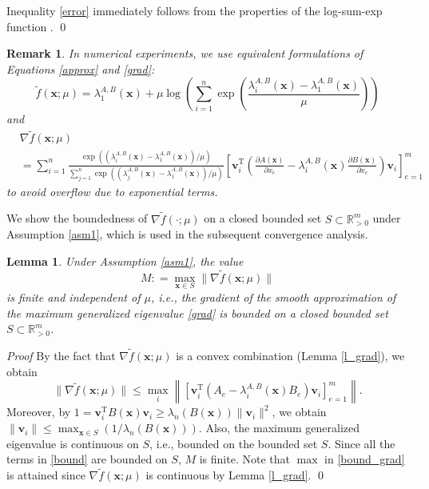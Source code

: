 \documentclass[sn-mathphys,Numbered]{sn-jnl}%
\theoremstyle{thmstyleone}%
\theoremstyle{thmstyletwo}%
\newtheorem{remark}{Remark}%
\theoremstyle{thmstylethree}%
\newtheorem{lemma}[theorem]{Lemma}
\newcommand{\e}[1]{\begin{equation}#1\end{equation}}
\newcommand{\s}[1]{\begin{split}#1\end{split}}
\newcommand{\prn}[1]{\left(#1\right)}
\newcommand{\nrm}[1]{\left\|#1\right\|}
\def\coloneq{\mathrel{\mathop:}=}
\def\rm{\mathbb{R}^m}
\def\tp{\mathrm{T}}
\def\lamx{\lambda^{A,B}_1(\boldsymbol{x})}
\def\lamxi{\lambda^{A,B}_i(\boldsymbol{x})}
\def\lamxj{\lambda^{A,B}_j(\boldsymbol{x})}
\begin{document}
Inequality \eqref{error} immediately follows from the properties of the log-sum-exp function \cite{beck17}.
\qed

\begin{remark}
In numerical experiments, we use equivalent formulations of Equations \eqref{approx} and \eqref{grad}:
\e{
\tilde{f}(\bm{x};\mu)=\lamx+\mu\log\left(\sum_{i=1}^n \exp{\left(\frac{\lamxi-\lamx}{\mu}\right)}\right)
}
and 
\e{\s{
& \nabla\tilde{f}(\bm{x};\mu)\\
& = \sum_{i=1}^n\frac{\exp\prn{\prn{\lamxi-\lamx}/\mu}}{\sum_{j=1}^n \exp\prn{\prn{\lamxj-\lamx}/\mu}}\left[\bm{v}_i^\tp \left(\frac{\partial A(\bm{x})}{\partial x_e}-\lamxi \frac{\partial B(\bm{x})}{\partial x_e}\right)\bm{v}_i\right]_{e=1}^m
}}
to avoid overflow due to exponential terms.
\end{remark}

We show the boundedness of $\nabla\tilde{f}(\cdot;\mu)$ on a closed bounded set $S\subset\rm_{>0}$ under Assumption \ref{asm1}, which is used in the subsequent convergence analysis.

\begin{lemma}
Under Assumption \ref{asm1}, the value 
\e{
M\coloneq\max_{\bm{x}\in S}\|\nabla \tilde{f}(\bm{x};\mu)\|
\label{bound_grad}
}
is finite and independent of $\mu$, i.e., the gradient of the smooth approximation of the maximum generalized eigenvalue \eqref{grad} is bounded on a closed bounded set $S\subset\rm_{>0}$.
\end{lemma}
{\it Proof }
By the fact that $\nabla\tilde{f}(\bm{x};\mu)$ is a convex combination (Lemma \ref{l_grad}), we obtain
\e{
\|\nabla\tilde{f}(\bm{x};\mu)\|\le \max_i\nrm{\left[\bm{v}_i^\tp \left(A_e-\lamxi B_e\right)\bm{v}_i\right]_{e=1}^m}.
\label{bound}
}
Moreover, by $1=\bm{v}_i^\tp B(\bm{x})\bm{v}_i\ge\lambda_n(B(\bm{x}))\|\bm{v}_i\|^2$, we obtain $\|\bm{v}_i\|\le \max_{\bm{x}\in S}(1/\lambda_n(B(\bm{x})))$. Also, the maximum generalized eigenvalue is continuous on $S$, i.e., bounded on the bounded set $S$. Since all the terms in \eqref{bound} are bounded on $S$, $M$ is finite. Note that $\max$ in \eqref{bound_grad} is attained since $\nabla\tilde{f}(\bm{x};\mu)$ is continuous by Lemma \ref{l_grad}.
\qed
\end{document}
